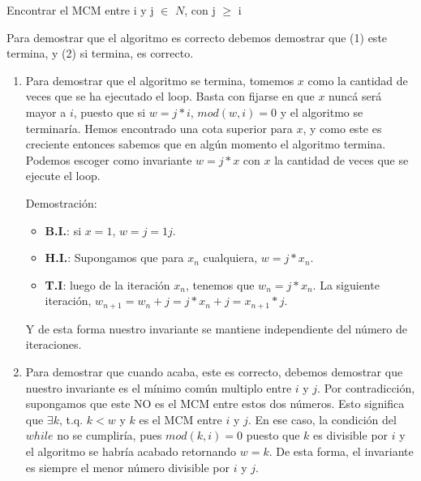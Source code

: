 \begin{algorithm}
    \caption{Encontrar el MCM entre i y j $\in$ $N$, con j $\geq$ i}
    \begin{algorithmic}
        \ENDWHILE
    \end{algorithmic}
\end{algorithm}
    
        
Para demostrar que el algoritmo es correcto debemos demostrar que (1) este termina, y (2) si termina, es correcto. 

\begin{enumerate}
    \item Para demostrar que el algoritmo se termina, tomemos $x$ como la cantidad de veces que se ha ejecutado el loop. Basta con fijarse en que $x$ nuncá será mayor a $i$, puesto que si $w = j*i$, $mod(w, i) = 0$ y el algoritmo se terminaría. Hemos encontrado una cota superior para $x$, y como este es creciente entonces sabemos que en algún momento el algoritmo termina. Podemos escoger como invariante $w =  j*x$ con $x$ la cantidad de veces que se ejecute el loop. 
    
    Demostración:
    \begin{itemize}[label={}]
      \item \textbf{B.I.}: si $x = 1$, $w = j = 1 j$.
      \item \textbf{H.I.}: Supongamos que para $x_n$ cualquiera, $w = j * x_n$.
      \item \textbf{T.I}: luego de la iteración $x_n$, tenemos que $w_n = j * x_n$. La siguiente iteración, $w_{n+1} = w_n + j = j*x_n + j = x_{n+1} * j$. 
    \end{itemize}
    
    Y de esta forma nuestro invariante se mantiene independiente del número de iteraciones.
    
    \item Para demostrar que cuando acaba, este es correcto, debemos demostrar que nuestro invariante es el mínimo común multiplo entre $i$ y $j$. Por contradicción, supongamos que este NO es el MCM entre estos dos números. Esto significa que $\exists k$, t.q. $k < w$ y $k$ es el MCM entre $i$ y $j$. En ese caso, la condición del $while$ no se cumpliría, pues $mod(k, i) = 0$ puesto que $k$ es divisible por $i$ y el algoritmo se habría acabado retornando $w = k$. De esta forma, el invariante es siempre el menor número divisible por $i$ y $j$.
\end{enumerate}

